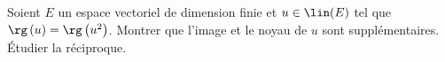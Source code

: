 \begin{enonce}
\begin{exercise}[ID={RMS123 E961, CCP PSI},subtitle={},tags={}]
Soient $E$ un espace vectoriel de dimension finie et $u\in\lin(E)$ tel que $\rg\left( u \right)=\rg\left( u^2 \right)$.
Montrer que l'image et le noyau de $u$ sont supplémentaires.
Étudier la réciproque.
\end{exercise}
\begin{solution}
\end{solution}
\end{enonce}

